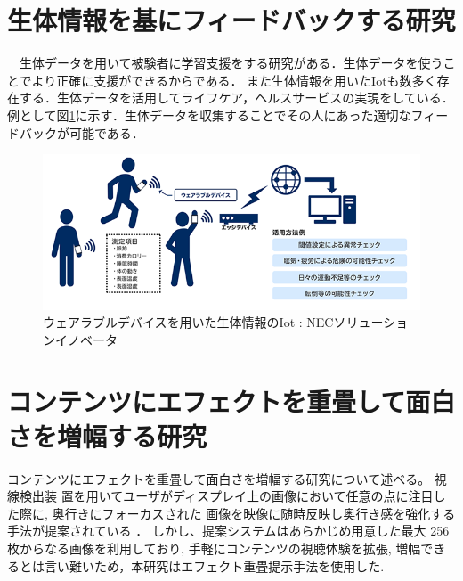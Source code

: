 \section{生体情報を基にフィードバックする研究}

　生体データを用いて被験者に学習支援をする研究がある\cite{seitai1,seitai2,seitai3}．生体データを使うことでより正確に支援ができるからである．
また生体情報を用いたIotも数多く存在する．生体データを活用してライフケア，ヘルスサービスの実現をしている．
例として図\ref{iot}に示す．生体データを収集することでその人にあった適切なフィードバックが可能である．

\begin{figure}[H]
    \centering
    \includegraphics[width=15cm]{images/chapter2/body_img02.png}
    \caption{ウェアラブルデバイスを用いた生体情報のIot : NECソリューションイノベータ}
    \label{iot}
\end{figure}


\section{コンテンツにエフェクトを重畳して面白さを増幅する研究}
コンテンツにエフェクトを重畳して面白さを増幅する研究について述べる。
視線検出装 置を用いてユーザがディスプレイ上の画像において任意の点に注目した際に, 奥行きにフォーカスされた 画像を映像に随時反映し奥行き感を強化する手法が提案されている\cite{shamo1}\cite{shamo2} ．
しかし、提案システムはあらかじめ用意した最大 256 枚からなる画像を利用しており, 手軽にコンテンツの視聴体験を拡張, 増幅できるとは言い難いため\cite{shamo3}，本研究はエフェクト重畳提示手法を使用した. 

